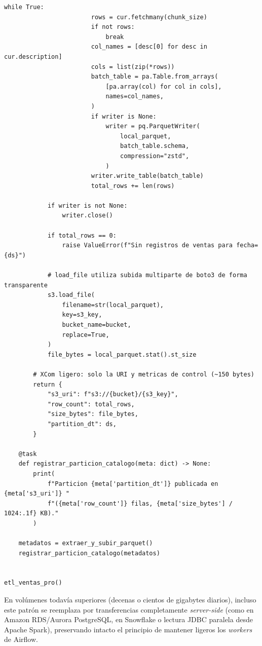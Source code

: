 \begin{examplebox}
\begin{lstlisting}[style=python, caption={Versión de producción: extracción por cursor en streaming, escritura incremental en Parquet y paso exclusivo de URI por XCom.}, label={lst:postgres-s3-pro}]
                    while True:
                        rows = cur.fetchmany(chunk_size)
                        if not rows:
                            break
                        col_names = [desc[0] for desc in cur.description]
                        cols = list(zip(*rows))
                        batch_table = pa.Table.from_arrays(
                            [pa.array(col) for col in cols],
                            names=col_names,
                        )
                        if writer is None:
                            writer = pq.ParquetWriter(
                                local_parquet,
                                batch_table.schema,
                                compression="zstd",
                            )
                        writer.write_table(batch_table)
                        total_rows += len(rows)

            if writer is not None:
                writer.close()

            if total_rows == 0:
                raise ValueError(f"Sin registros de ventas para fecha={ds}")

            # load_file utiliza subida multiparte de boto3 de forma transparente
            s3.load_file(
                filename=str(local_parquet),
                key=s3_key,
                bucket_name=bucket,
                replace=True,
            )
            file_bytes = local_parquet.stat().st_size

        # XCom ligero: solo la URI y metricas de control (~150 bytes)
        return {
            "s3_uri": f"s3://{bucket}/{s3_key}",
            "row_count": total_rows,
            "size_bytes": file_bytes,
            "partition_dt": ds,
        }

    @task
    def registrar_particion_catalogo(meta: dict) -> None:
        print(
            f"Particion {meta['partition_dt']} publicada en {meta['s3_uri']} "
            f"({meta['row_count']} filas, {meta['size_bytes'] / 1024:.1f} KB)."
        )

    metadatos = extraer_y_subir_parquet()
    registrar_particion_catalogo(metadatos)


etl_ventas_pro()
\end{lstlisting}
\end{examplebox}

En volúmenes todavía superiores (decenas o cientos de gigabytes diarios), incluso este patrón se reemplaza por transferencias completamente \textit{server-side} (como  en Amazon RDS/Aurora PostgreSQL,  en Snowflake o lectura JDBC paralela desde Apache Spark), preservando intacto el principio de mantener ligeros los \textit{workers} de Airflow.

